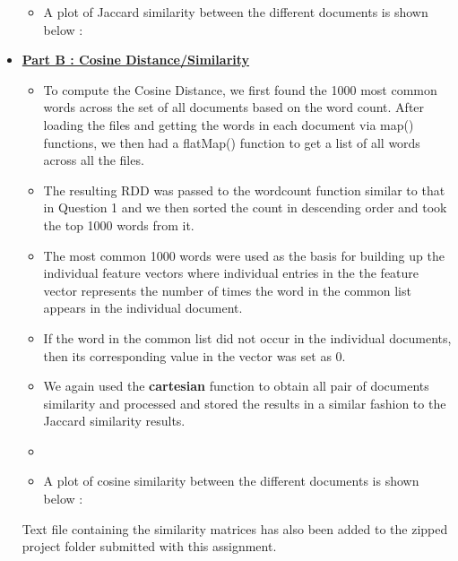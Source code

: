 \documentclass[11pt]{article}
\begin{document}
\begin{itemize}
\begin{itemize}
\item[] A plot of Jaccard similarity between the different documents is shown below :

\end{itemize}




\item[] \textbf{\underline{Part B : Cosine Distance/Similarity}}

\begin{itemize}

\item[] To compute the Cosine Distance, we first found the 1000 most common words across the set of all documents based on the word count. After loading the files and getting the words in each document via map() functions, we then had a flatMap() function to get a list of all words across all the files.

\item The resulting RDD was passed to the wordcount function similar to that in Question 1 and we then sorted the count in descending order and took the top 1000 words from it.

\item[] The most common 1000 words were used as the basis for building up the individual feature vectors where individual entries in the the feature vector represents the number of times the word in the common list appears in the individual document. 

\item If the word in the common list did not occur in the individual documents, then its corresponding value in the vector was set as 0.

\item We again used the \textbf{cartesian} function to obtain all pair of documents similarity and processed and stored the results in a similar fashion to the Jaccard similarity results.

\item[] \item[] A plot of cosine similarity between the different documents is shown below :



\end{itemize}


Text file containing the similarity matrices has also been added to the zipped project folder submitted with this assignment.

\end{itemize}
\end{document}
